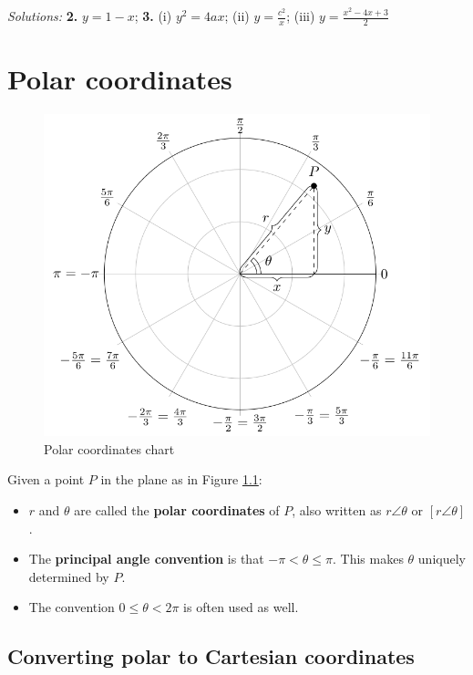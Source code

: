 \documentclass[
  12pt,
  oneside]{book}
\providecommand{\tightlist}{%
  \setlength{\itemsep}{0pt}\setlength{\parskip}{0pt}}
\theoremstyle{definition}
\theoremstyle{definition}
\theoremstyle{definition}
\theoremstyle{definition}
\theoremstyle{remark}
\begin{document}
\emph{Solutions:}
\textbf{2.} \(y=1-x\);
\textbf{3.} (i) \(y^2=4ax\);
(ii) \(y=\frac{c^2}{x}\);
(iii) \(y=\frac{x^2-4x+3}{2}\)

\hypertarget{polar-coordinates}{%
\chapter{Polar coordinates}\label{polar-coordinates}}

\begin{figure}

{\centering \includegraphics{t18-polar-pics-1} 

}

\caption{Polar coordinates chart}\label{fig:t18-polar-chart}
\end{figure}

Given a point \(P\) in the plane as in Figure \ref{fig:t18-polar-chart}:

\begin{itemize}
\tightlist
\item
  \(r\) and \(\theta\) are called the \textbf{polar coordinates} of \(P\), also written as \(r\angle\theta\) or \([r\angle\theta]\).
\item
  The \textbf{principal angle convention} is that \(-\pi<\theta\leq\pi\). This makes \(\theta\) uniquely determined by \(P\).
\item
  The convention \(0\leq\theta<2\pi\) is often used as well.
\end{itemize}

\hypertarget{converting-polar-to-cartesian-coordinates}{%
\section{Converting polar to Cartesian coordinates}\label{converting-polar-to-cartesian-coordinates}}
\end{document}
